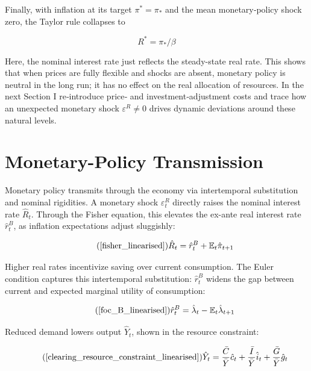 \documentclass[11pt,preprint]{elsarticle}
\numberwithin{equation}{section}
\numberwithin{figure}{section}
\numberwithin{table}{section}
\begin{document}
Finally, with inflation at its target \(\pi^*=\pi_*\) and the mean
monetary‐policy shock zero, the Taylor rule collapses to

\begin{equation}
R^* = \pi_*/\beta
\end{equation}

Here, the nominal interest rate just reflects the steady-state real
rate. This shows that when prices are fully flexible and shocks are
absent, monetary policy is neutral in the long run; it has no effect on
the real allocation of resources. In the next Section I re‐introduce
price‐ and investment‐adjustment costs and trace how an unexpected
monetary shock \(\varepsilon^R\neq0\) drives dynamic deviations around
these natural levels.

\section{\texorpdfstring{Monetary-Policy Transmission
\label{MPT}}{Monetary-Policy Transmission }}\label{monetary-policy-transmission}

Monetary policy transmits through the economy via intertemporal
substitution and nominal rigidities. A monetary shock
\(\varepsilon_t^R\) directly raises the nominal interest rate
\(\hat{R}_t\). Through the Fisher equation, this elevates the ex-ante
real interest rate \(\hat{r}^B_t\), as inflation expectations adjust
sluggishly:

\begin{equation}\tag{\ref{fisher_linearised}}
\hat{R}_t = \hat{r}^B_t + \mathbb{E}_t \hat{\pi}_{t+1}
\end{equation}

Higher real rates incentivize saving over current consumption. The Euler
condition captures this intertemporal substitution: \(\hat{r}^B_t\)
widens the gap between current and expected marginal utility of
consumption:

\begin{equation}\tag{\ref{foc_B_linearised}}
\hat{r}^B_t = \hat{\lambda}_t - \mathbb{E}_t \hat{\lambda}_{t+1}
\end{equation}

Reduced demand lowers output \(\hat{Y}_t\), shown in the resource
constraint:

\begin{equation}\tag{\ref{clearing_resource_constraint_linearised}}
\hat{Y}_t = \frac{\bar{C}}{\bar{Y}} \hat{c}_t + \frac{\bar{I}}{\bar{Y}} \hat{i}_t + \frac{\bar{G}}{\bar{Y}} \hat{g}_t
\end{equation}
\end{document}
